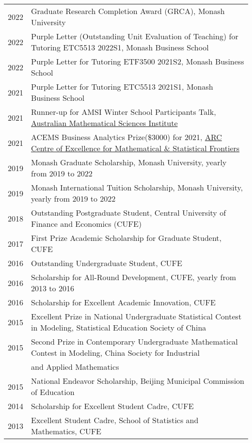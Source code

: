 \documentclass[10pt,a4paper,]{article}
\begin{document}
\begin{tabular}{rl}
  2022 & Graduate Research Completion Award (GRCA), Monash University \\
  2022 & Purple Letter (Outstanding Unit Evaluation of Teaching) for Tutoring ETC5513 2022S1, Monash Business School \\ 
  2022 & Purple Letter for Tutoring ETF3500 2021S2, Monash Business School \\ 
  2021 & Purple Letter for Tutoring ETC5513 2021S1, Monash Business School \\ 
  2021 & Runner-up for AMSI Winter School Participants Talk, \href{https://ws.amsi.org.au/}{Australian Mathematical Sciences Institute} \\ 
  2021 & ACEMS Business Analytics Prize(\$3000) for 2021, \href{https://acems.org.au}{ARC Centre of Excellence for Mathematical \& Statistical Frontiers} \\ 
  2019 & Monash Graduate Scholarship, Monash University, yearly from 2019 to 2022 \\ 
  2019 & Monash International Tuition Scholarship, Monash University, yearly from 2019 to 2022 \\ 
  2018 & Outstanding Postgraduate Student, Central University of Finance and Economics (CUFE) \\ 
  2017 & First Prize Academic Scholarship for Graduate Student, CUFE \\ 
  2016 & Outstanding Undergraduate Student, CUFE \\ 
  2016 & Scholarship for All-Round Development, CUFE, yearly from 2013 to 2016 \\ 
  2016 & Scholarship for Excellent Academic Innovation, CUFE \\ 
  2015 & Excellent Prize in National Undergraduate Statistical Contest in Modeling, Statistical Education Society of China \\ 
  2015 & Second Prize in Contemporary Undergraduate Mathematical Contest in Modeling, China Society for Industrial \\
       & and Applied Mathematics \\ 
  2015 & National Endeavor Scholarship, Beijing Municipal Commission of Education \\ 
  2014 & Scholarship for Excellent Student Cadre, CUFE \\ 
  2013 & Excellent Student Cadre, School of Statistics and Mathematics, CUFE \\ 
\end{tabular}
\end{document}
